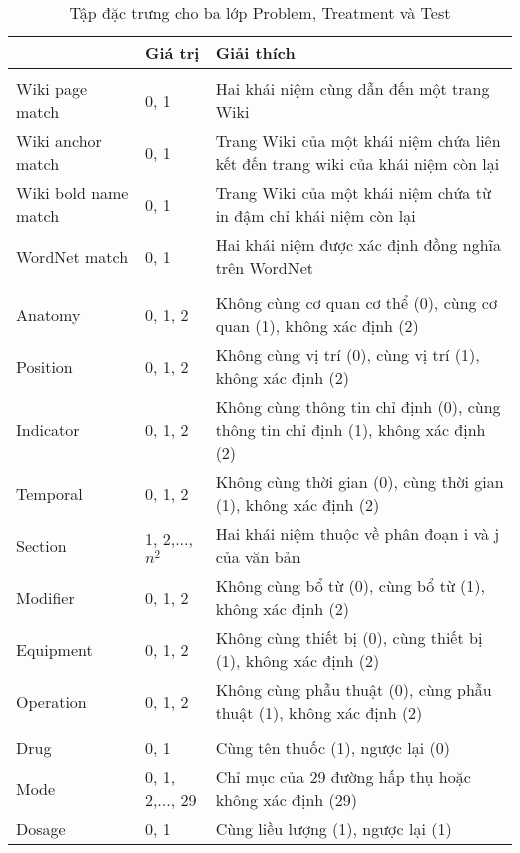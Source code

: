 \begin{table}[th]
\centering
\caption{Tập đặc trưng cho ba lớp Problem, Treatment và Test \label{tab:ProbTreatTestFeatures}}
\footnotesize\sffamily

\begin{tabularx}{\textwidth}{@{}>{\hspace{1em}}P{\raggedright}{0.3}lL@{}}
\toprule 
{} & \textbf{Giá trị} & \textbf{Giải thích}\\
\midrule
{}\\
Wiki page match & 0, 1 & Hai khái niệm cùng dẫn đến một trang Wiki\\
Wiki anchor match & 0, 1 & Trang Wiki của một khái niệm chứa liên kết đến trang wiki của khái niệm còn lại\\
Wiki bold name match & 0, 1 & Trang Wiki của một khái niệm chứa từ in đậm chỉ khái niệm còn lại\\
WordNet match & 0, 1 & Hai khái niệm được xác định đồng nghĩa trên WordNet\\
\\
Anatomy & 0, 1, 2 & Không cùng cơ quan cơ thể (0), cùng cơ quan (1), không xác định (2)\\
Position & 0, 1, 2 & Không cùng vị trí (0), cùng vị trí (1), không xác định (2)\\
Indicator & 0, 1, 2 & Không cùng thông tin chỉ định (0), cùng thông tin chỉ định (1), không xác định (2)\\
Temporal & 0, 1, 2 & Không cùng thời gian (0), cùng thời gian (1), không xác định (2)\\
Section & 1, 2,..., $n^{2}$ & Hai khái niệm thuộc về phân đoạn i và j của văn bản\\
Modifier & 0, 1, 2 & Không cùng bổ từ (0), cùng bổ từ (1), không xác định (2)\\
Equipment & 0, 1, 2 & Không cùng thiết bị (0), cùng thiết bị (1), không xác định (2)\\
Operation & 0, 1, 2 & Không cùng phẫu thuật (0), cùng phẫu thuật (1), không xác định (2)\\
\\
Drug & 0, 1 & Cùng tên thuốc (1), ngược lại (0)\\
Mode & 0, 1, 2,..., 29 & Chỉ mục của 29 đường hấp thụ hoặc không xác định (29)\\
Dosage & 0, 1 & Cùng liều lượng (1), ngược lại (1)\\

\end{tabularx}
\end{table}
